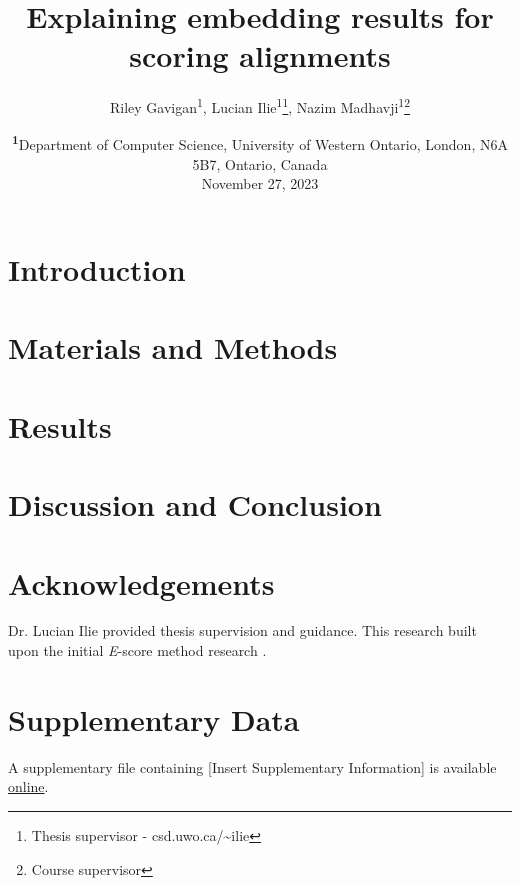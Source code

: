 \documentclass[
	letterpaper, %
	12pt, %
]{journalArticle}
\title{Explaining embedding results for scoring alignments}
\author{
	Riley Gavigan\textsuperscript{1}, Lucian Ilie\textsuperscript{1}\thanks{Thesis supervisor - csd.uwo.ca/\textasciitilde ilie}, Nazim Madhavji\textsuperscript{1}\thanks{Course supervisor}\\
}
\date{{\footnotesize{\textsuperscript{\textbf{1}}Department of Computer Science, University of Western Ontario, London, N6A 5B7, Ontario, Canada\\}}\vspace{1em}November 27, 2023\\}
\begin{document}
\maketitle %
\section{Introduction}


\section{Materials and Methods}


\section{Results}


\section{Discussion and Conclusion}


\section{Acknowledgements}
Dr. Lucian Ilie provided thesis supervision and guidance. This research built upon the initial \textit{E}-score method research \autocite{Ashrafzadeh:2023}.

\section{Supplementary Data}
A supplementary file containing [Insert Supplementary Information] is available \href{https://rileygavigan.com/e-score-supplementary-data.pdf}{online}.


\printbibliography %

\end{document}
